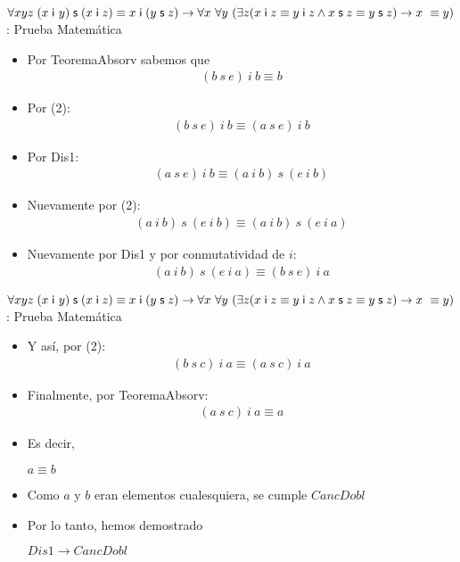 \documentclass[10pt]{beamer}
\newcommand{\Cfonti}{\fontsize{8.5}{7.2}\selectfont}
\newcommand{\acot}{Dis1\rightarrow CancDobl}
\newcommand{\idistr}{\forall xyz\;(x\;\mathsf{i}\
y)\;\mathsf{s}\;(x\;\mathsf{i}\;z)\equiv x\;\mathsf{i}\;(y\;\mathsf{s}%
\;z)}
\newcommand{\myconj}{x\;\mathsf{i}\;z\equiv y\;\mathsf{%
i}\;z\wedge x\;\mathsf{s}\;z\equiv y\;\mathsf{s}\;z}
\begin{document}
\begin{frame}{\Cfonti$\idistr \rightarrow \forall x\ \forall y\ (\exists z (\myconj) \rightarrow x\ \equiv y)$:
   Prueba Matemática}
  \begin{itemize}[<+->]

    \item Por TeoremaAbsorv sabemos que
      \begin{align}
        (b\ s\ e)\ i\ b \equiv b
      \end{align}
    \item Por (2):
      \begin{align}
        (b\ s\ e)\ i\ b \equiv (a\ s\ e)\ i\ b
      \end{align}
    \item Por Dis1:
      \begin{align}
        (a\ s\ e)\ i\ b \equiv (a\ i\ b)\ s\ (e\ i\ b)
      \end{align}
    \item Nuevamente por (2):
      \begin{align}
        (a\ i\ b)\ s\ (e\ i\ b) \equiv (a\ i\ b)\ s\ (e\ i\ a)
      \end{align}

    \item Nuevamente por Dis1 y por conmutatividad de $i$:
      \begin{align}
        (a\ i\ b)\ s\ (e\ i\ a) \equiv (b\ s\ e)\ i\ a
      \end{align}


  \end{itemize}
\end{frame}


\begin{frame}{\Cfonti$\idistr \rightarrow \forall x\ \forall y\ (\exists z (\myconj) \rightarrow x\ \equiv y)$:
   Prueba Matemática}
  \begin{itemize}[<+->]
    \item Y así, por (2):
      \begin{align}
        (b\ s\ c)\ i\ a \equiv (a\ s\ c)\ i\ a
      \end{align}

    \item Finalmente, por TeoremaAbsorv:
      \begin{align}
        (a\ s\ c)\ i\ a \equiv a
      \end{align}
    \item Es decir,
      \begin{center}
        $a \equiv b$
      \end{center}

    \item Como $a$ y $b$ eran elementos cualesquiera, se cumple $CancDobl$

    \item Por lo tanto, hemos demostrado
      \begin{center}
        $\acot$
      \end{center}

  \end{itemize}
\end{frame}
\end{document}
